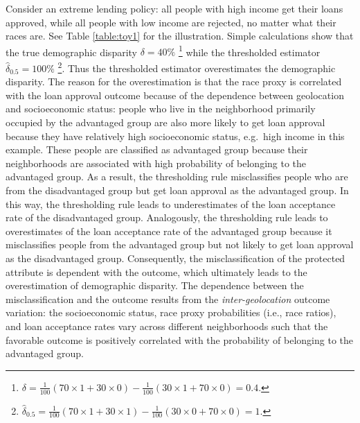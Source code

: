 \begin{example}
\label{ex:income}
Consider an extreme lending policy: all people with high income get their loans approved, while all people with low income are rejected, no matter what their races are.
See Table \ref{table:toy1} for the illustration.
  Simple calculations show that the true demographic disparity $\delta = 40\%$ \footnote{$\delta = \frac{1}{100}(70\times 1 + 30\times 0) - \frac{1}{100}(30\times 1 + 70\times 0)  = 0.4$.} while the thresholded estimator $\hat{\delta}_{0.5} = 100\%$ \footnote{$\hat{\delta}_{0.5} = \frac{1}{100}(70\times 1 + 30\times 1) - \frac{1}{100}(30\times 0 + 70\times 0)  = 1$.}. Thus the thresholded estimator overestimates the demographic disparity. The reason for the overestimation is that the race proxy is correlated with the loan approval outcome because of the dependence between geolocation and socioeconomic status: people who live in the neighborhood primarily occupied by the advantaged group are also more likely to get loan approval because they have relatively high socioeconomic status, e.g.\ high income in this example. These people are classified as advantaged group because their neighborhoods are associated with high probability of belonging to the advantaged group. As a result, the thresholding rule misclassifies people who are from the disadvantaged group but get loan approval as the advantaged group. In this way, the thresholding rule leads to underestimates of the loan acceptance rate of the disadvantaged group. Analogously, the thresholding rule leads to overestimates of the loan acceptance rate of the advantaged group because it misclassifies people from the advantaged group but not likely to get loan approval as the disadvantaged group. Consequently, the misclassification of the protected attribute is dependent with the outcome, which ultimately leads to the overestimation of demographic disparity. The dependence between the misclassification and the outcome results from the \textit{inter-geolocation} outcome variation: the socioeconomic status, race proxy probabilities (i.e., race ratios), and loan acceptance rates vary across different neighborhoods such that the favorable outcome is positively correlated with the probability of belonging to the advantaged group.
\end{example}

